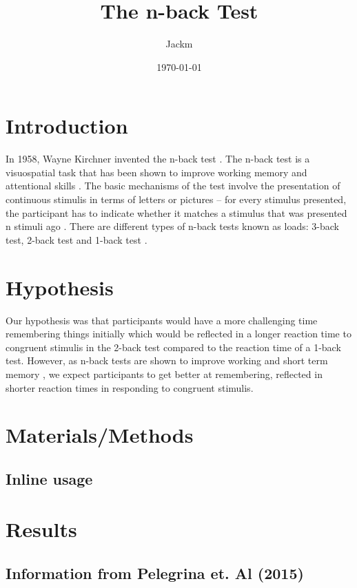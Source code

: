 \documentclass{article}
\author{Jackm}
\date{\today}
\title{The n-back Test}
\begin{document}
\maketitle
\tableofcontents


\section{Introduction}
\label{sec:org8b8b6b2}

In 1958, Wayne Kirchner invented the n-back test \cite{COULACOGLOU201791}. The n-back test is a visuospatial task that has been shown to improve working memory and attentional skills \cite{COLOM2013712}. The basic mechanisms of the test involve the presentation of continuous stimulis in terms of letters or pictures – for every stimulus presented, the participant has to indicate whether it matches a stimulus that was presented n stimuli ago \cite{Kane}. There are different types of n-back tests known as loads: 3-back test, 2-back test and 1-back test \cite{Forns}.

\section{Hypothesis}
\label{sec:orga6f14ff}

Our hypothesis was that participants would have a more challenging time remembering things initially which would be reflected in a longer reaction time to congruent stimulis in the 2-back test compared to the reaction time of a 1-back test. However, as n-back tests are shown to improve working and short term memory \cite{LEONDOMINGUEZ2015167}, we expect participants to get better at remembering, reflected in shorter reaction times in responding to congruent stimulis.

\section{Materials/Methods}
\label{sec:org394e780}

\subsection{Inline usage}
\label{sec:org6eaf17d}

\section{Results}
\label{sec:org5ec0dbd}
\subsection{Information from Pelegrina et. Al (2015)}
\label{sec:org0acac0a}
\end{document}
